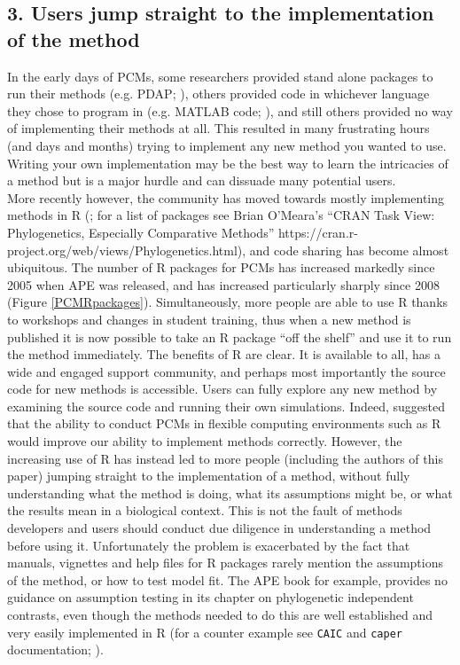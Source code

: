 \documentclass[a4paper,12pt]{article}
\begin{document}
  \subsection{3. Users jump straight to the implementation of the method}
    In the early days of PCMs, some researchers provided stand alone packages to run their methods (e.g. PDAP; \citealp{diaz1996testing}), others provided code in whichever language they chose to program in (e.g. MATLAB code; \citealp{rohlf2001comparative}), and still others provided no way of implementing their methods at all. 
    This resulted in many frustrating hours (and days and months) trying to implement any new method you wanted to use.
    Writing your own implementation may be the best way to learn the intricacies of a method but is a major hurdle and can dissuade many potential users.  \\

    More recently however, the community has moved towards mostly implementing methods in R (\citealp{R-Core-Team:2014aa}; for a list of packages see Brian O'Meara's ``CRAN Task View: Phylogenetics, Especially Comparative Methods'' https://cran.r-project.org/web/views/Phylogenetics.html), and code sharing has become almost ubiquitous. 
    The number of R packages for PCMs has increased markedly since 2005 when APE \citep{Paradis:2004aa} was released, and has increased particularly sharply since 2008 (Figure \ref{PCMRpackages}).
    Simultaneously, more people are able to use R thanks to workshops and changes in student training, thus when a new method is published it is now possible to take an R package ``off the shelf'' and use it to run the method immediately.
    The benefits of R are clear. 
    It is available to all, has a wide and engaged support community, and perhaps most importantly the source code for new methods is accessible.
    Users can fully explore any new method by examining the source code and running their own simulations. 
    Indeed, \citet{freckleton2009seven} suggested that the ability to conduct PCMs in flexible computing environments such as R would improve our ability to implement methods correctly. 
    However, the increasing use of R has instead led to more people (including the authors of this paper) jumping straight to the implementation of a method, without fully understanding what the method is doing, what its assumptions might be, or what the results mean in a biological context.
    This is not the fault of methods developers and users should conduct due diligence in understanding a method before using it. 
    Unfortunately the problem is exacerbated by the fact that manuals, vignettes and help files for R packages rarely mention the assumptions of the method, or how to test model fit. 
    The APE book \citep[an excellent resource;][]{paradis2011analysis} for example, provides no guidance on assumption testing in its chapter on phylogenetic independent contrasts, even though the methods needed to do this are well established and very easily implemented in R (for a counter example see \texttt{CAIC} and \texttt{caper} documentation; \citealp{purvis1995comparative,Orme:2013aa}).
\end{document}
